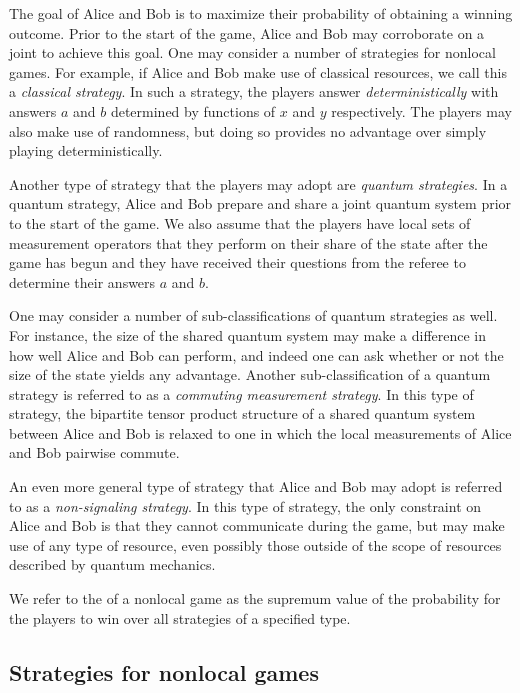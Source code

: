 The goal of Alice and Bob is to maximize their probability of obtaining a winning outcome. Prior to the start of the game, Alice and Bob may corroborate on a joint  to achieve this goal. One may consider a number of strategies for nonlocal games. For example, if Alice and Bob make use of classical resources, we call this a \emph{classical strategy}. In such a strategy, the players answer \emph{deterministically} with answers $a$ and $b$ determined by functions of $x$ and $y$ respectively. The players may also make use of randomness, but doing so provides no advantage over simply playing deterministically. 

Another type of strategy that the players may adopt are \emph{quantum strategies}. In a quantum strategy, Alice and Bob prepare and share a joint quantum system prior to the start of the game. We also assume that the players have local sets of measurement operators that they perform on their share of the state after the game has begun and they have received their questions from the referee to determine their answers $a$ and $b$. 

One may consider a number of sub-classifications of quantum strategies as well. For instance, the size of the shared quantum system may make a difference in how well Alice and Bob can perform, and indeed one can ask whether or not the size of the state yields any advantage. Another sub-classification of a quantum strategy is referred to as a \emph{commuting measurement strategy}. In this type of strategy, the bipartite tensor product structure of a shared quantum system between Alice and Bob is relaxed to one in which the local measurements of Alice and Bob pairwise commute. 

An even more general type of strategy that Alice and Bob may adopt is referred to as a \emph{non-signaling strategy}. In this type of strategy, the only constraint on Alice and Bob is that they cannot communicate during the game, but may make use of any type of resource, even possibly those outside of the scope of resources described by quantum mechanics. 

We refer to the  of a nonlocal game as the supremum value of the probability for the players to win over all strategies of a specified type. 

\subsection{Strategies for nonlocal games}
\label{sec:strategies-for-nonlocal-games}

